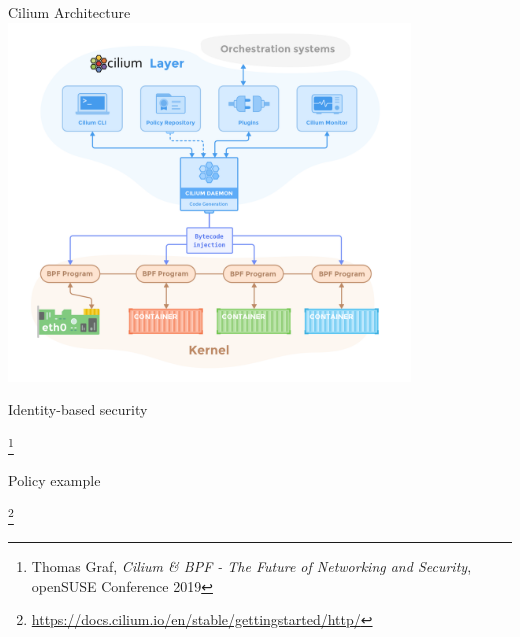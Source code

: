 \documentclass[black,white]{beamer}
\newcommand\blfootnote[1]{%
  \begingroup
  \renewcommand\thefootnote{}\footnote{#1}%
  \addtocounter{footnote}{-1}%
  \endgroup
}
\DeclareRobustCommand{\#}{\adjustbox{valign=B,totalheight=.57\baselineskip}{\oldhash}}%
\begin{document}
    \begin{frame}{Cilium Architecture}
        \centering
        \includegraphics[width=0.8\textwidth,keepaspectratio]{cilium_architecture.png}
    \end{frame}

    \begin{frame}{Identity-based security}
        \centering
        \vfill
        \begin{figure}
            
        \end{figure}
        \vfill
        \blfootnote{{\tiny Thomas Graf, {\em Cilium \& BPF - The Future of Networking and Security}, openSUSE Conference 2019}}
    \end{frame}

    \begin{frame}{Policy example}
        
        \blfootnote{\tiny \url{https://docs.cilium.io/en/stable/gettingstarted/http/}}
    \end{frame}

\end{document}
